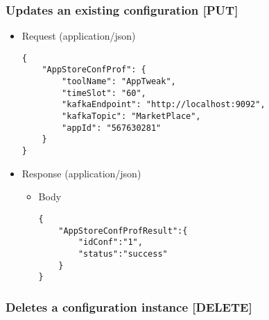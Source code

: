 \subsubsection{Updates an existing configuration
{[}PUT{]}}\label{updates-an-existing-configuration-put}

\begin{itemize}
\item
  Request (application/json)

\begin{verbatim}
{
    "AppStoreConfProf": {
        "toolName": "AppTweak",
        "timeSlot": "60",
        "kafkaEndpoint": "http://localhost:9092",
        "kafkaTopic": "MarketPlace",
        "appId": "567630281"
    }
}
\end{verbatim}
\item
  Response (application/json)

  \begin{itemize}
  \item
    Body

\begin{verbatim}
{
    "AppStoreConfProfResult":{
        "idConf":"1",
        "status":"success"
    }
}
\end{verbatim}
  \end{itemize}
\end{itemize}

\subsubsection{Deletes a configuration instance
{[}DELETE{]}}\label{deletes-a-configuration-instance-delete}